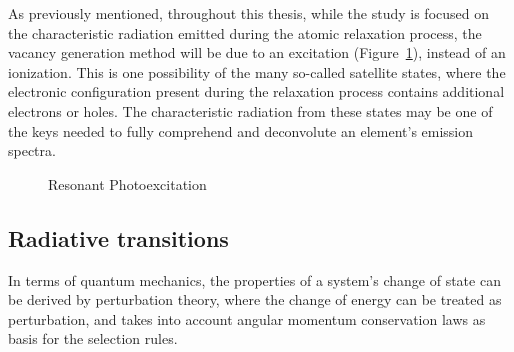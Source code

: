 As previously mentioned, throughout this thesis, while the study is focused on the characteristic radiation emitted during the atomic relaxation process, the vacancy generation method will be due to an excitation (Figure~\ref{fig:exc}), instead of an ionization. This is one possibility of the many so-called satellite states, where the electronic configuration present during the relaxation process contains additional electrons or holes.
The characteristic radiation from these states may be one of the keys needed to fully comprehend and deconvolute an element's emission spectra.


\begin{figure}[h!]
    \centering
    \caption{Resonant Photoexcitation}\label{fig:exc}
\end{figure}

\subsection{Radiative transitions}



In terms of quantum mechanics, the properties of a system's change of state can be derived by perturbation theory, where the change of energy can be treated as perturbation, and takes into account angular momentum  conservation laws as basis for the selection rules.

